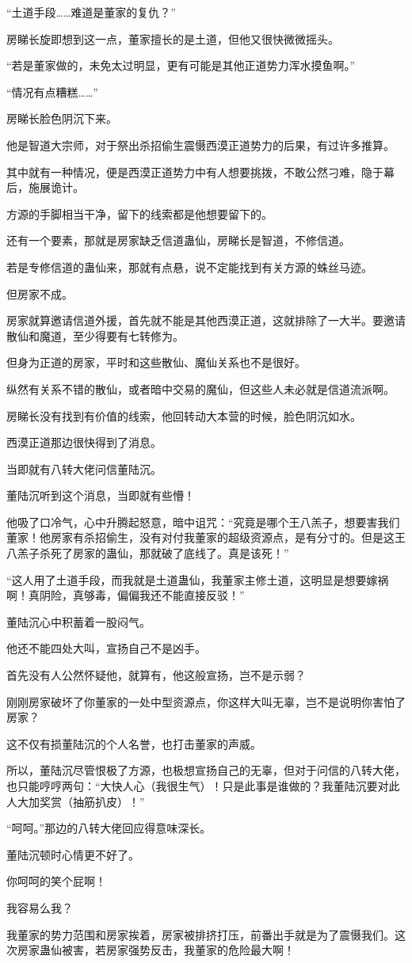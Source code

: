 \begin{this_body}
“土道手段……难道是董家的复仇？”

房睇长旋即想到这一点，董家擅长的是土道，但他又很快微微摇头。

“若是董家做的，未免太过明显，更有可能是其他正道势力浑水摸鱼啊。”

“情况有点糟糕……”

房睇长脸色阴沉下来。

他是智道大宗师，对于祭出杀招偷生震慑西漠正道势力的后果，有过许多推算。

其中就有一种情况，便是西漠正道势力中有人想要挑拨，不敢公然刁难，隐于幕后，施展诡计。

方源的手脚相当干净，留下的线索都是他想要留下的。

还有一个要素，那就是房家缺乏信道蛊仙，房睇长是智道，不修信道。

若是专修信道的蛊仙来，那就有点悬，说不定能找到有关方源的蛛丝马迹。

但房家不成。

房家就算邀请信道外援，首先就不能是其他西漠正道，这就排除了一大半。要邀请散仙和魔道，至少得要有七转修为。

但身为正道的房家，平时和这些散仙、魔仙关系也不是很好。

纵然有关系不错的散仙，或者暗中交易的魔仙，但这些人未必就是信道流派啊。

房睇长没有找到有价值的线索，他回转动大本营的时候，脸色阴沉如水。

西漠正道那边很快得到了消息。

当即就有八转大佬问信董陆沉。

董陆沉听到这个消息，当即就有些懵！

他吸了口冷气，心中升腾起怒意，暗中诅咒：“究竟是哪个王八羔子，想要害我们董家！他房家有杀招偷生，没有对付我董家的超级资源点，是有分寸的。但是这王八羔子杀死了房家的蛊仙，那就破了底线了。真是该死！”

“这人用了土道手段，而我就是土道蛊仙，我董家主修土道，这明显是想要嫁祸啊！真阴险，真够毒，偏偏我还不能直接反驳！”

董陆沉心中积蓄着一股闷气。

他还不能四处大叫，宣扬自己不是凶手。

首先没有人公然怀疑他，就算有，他这般宣扬，岂不是示弱？

刚刚房家破坏了你董家的一处中型资源点，你这样大叫无辜，岂不是说明你害怕了房家？

这不仅有损董陆沉的个人名誉，也打击董家的声威。

所以，董陆沉尽管恨极了方源，也极想宣扬自己的无辜，但对于问信的八转大佬，也只能哼哼两句：“大快人心（我很生气）！只是此事是谁做的？我董陆沉要对此人大加奖赏（抽筋扒皮）！”

“呵呵。”那边的八转大佬回应得意味深长。

董陆沉顿时心情更不好了。

你呵呵的笑个屁啊！

我容易么我？

我董家的势力范围和房家挨着，房家被排挤打压，前番出手就是为了震慑我们。这次房家蛊仙被害，若房家强势反击，我董家的危险最大啊！

\end{this_body}

